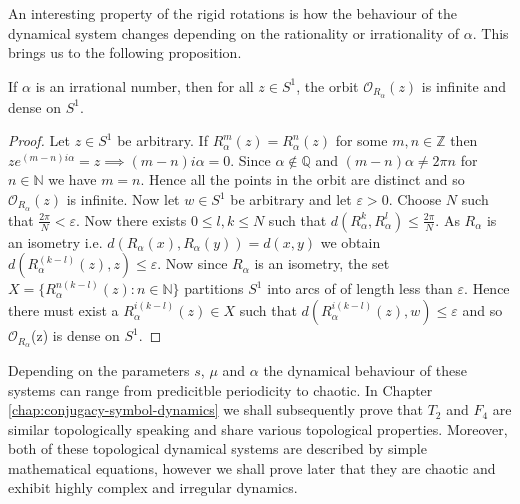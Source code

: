 An interesting property of the rigid rotations is how the behaviour of the dynamical system changes depending on the rationality or irrationality of $\alpha$. This brings us to the following proposition.

\begin{prop} \label{prop:rigid-rotations-irrational}
    If $\alpha$ is an irrational number, then for all $z \in S^1$, the orbit $\mathcal{O}_{R_\alpha}(z)$ is infinite and dense on $S^1$.
    \begin{proof}
        Let $z \in S^1$ be arbitrary. If $R_\alpha^m(z) = R_\alpha^n(z)$ for some $m, n \in \mathbb{Z}$ then $ze^{(m-n)i\alpha} = z \implies (m - n)i\alpha = 0$. Since $\alpha \notin \mathbb{Q}$ and $(m - n)\alpha \neq 2\pi n$ for $n \in \mathbb{N}$ we have $m = n$. Hence all the points in the orbit are distinct and so $\mathcal{O}_{R_\alpha}(z)$ is infinite. Now let $w \in S^1$ be arbitrary and let $\varepsilon > 0$. Choose $N$ such that $\frac{2\pi}{N} < \varepsilon$. Now there exists $0 \leq l, k \leq N$ such that $d\left( R_\alpha^k, R_\alpha^l \right) \leq \frac{2\pi}{N}$. As $R_\alpha$ is an isometry i.e. $d(R_\alpha(x), R_\alpha(y)) = d(x, y)$ we obtain $d(R_\alpha^{(k - l)}(z), z) \leq \varepsilon$. Now since $R_\alpha$ is an isometry, the set $X = \lbrace R_\alpha^{n(k - l)}(z) : n \in \mathbb{N} \rbrace$ partitions $S^1$ into arcs of of length less than $\varepsilon$. Hence there must exist a $R_\alpha^{i(k - l)}(z) \in X$ such that $d(R_\alpha^{i(k - l)}(z), w) \leq \varepsilon$ and so $\mathcal{O}_{R_{\alpha}}$(z) is dense on $S^1$.
    \end{proof}
\end{prop}

Depending on the parameters $s$, $\mu$ and $\alpha$ the dynamical behaviour of these systems can range from predicitble periodicity to chaotic. In Chapter \ref{chap:conjugacy-symbol-dynamics} we shall subsequently prove that $T_2$ and $F_4$ are similar topologically speaking and share various topological properties. Moreover, both of these topological dynamical systems are described by simple mathematical equations, however we shall prove later that they are chaotic and exhibit highly complex and irregular dynamics.